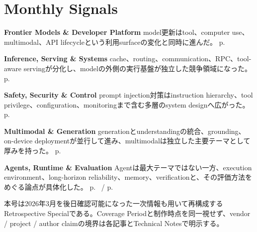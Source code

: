 \section*{Monthly Signals}
\smallskip
\noindent\textbf{Frontier Models \& Developer Platform} model更新はtool、computer use、multimodal、API lifecycleという利用surfaceの変化と同時に進んだ。 \hfill{\footnotesize p.~\pageref{pkg:frontier-models-platform-march}}\par
\smallskip
\noindent\textbf{Inference, Serving \& Systems} cache、routing、communication、RPC、tool-aware servingが分化し、modelの外側の実行基盤が独立した競争領域になった。 \hfill{\footnotesize p.~\pageref{pkg:inference-serving-systems-march}}\par
\smallskip
\noindent\textbf{Safety, Security \& Control} prompt injection対策はinstruction hierarchy、tool privilege、configuration、monitoringまで含む多層のsystem designへ広がった。 \hfill{\footnotesize p.~\pageref{pkg:safety-security-control-march}}\par
\smallskip
\noindent\textbf{Multimodal \& Generation} generationとunderstandingの統合、grounding、on-device deploymentが並行して進み、multimodalは独立した主要テーマとして厚みを持った。 \hfill{\footnotesize p.~\pageref{pkg:multimodal-generation-march}}\par
\smallskip
\noindent\textbf{Agents, Runtime \& Evaluation} Agentは最大テーマではない一方、execution environment、long-horizon reliability、memory、verificationと、その評価方法をめぐる論点が具体化した。 \hfill{\footnotesize p.~\pageref{pkg:agents-runtime-long-horizon-march} / p.~\pageref{pkg:paper-watch-march}}\par
\medskip
\begin{claimboundary}
本号は2026年3月を後日確認可能になった一次情報も用いて再構成するRetrospective Specialである。Coverage Periodと制作時点を同一視せず、vendor / project / author claimの境界は各記事とTechnical Notesで明示する。
\end{claimboundary}
\medskip
\setcounter{tocdepth}{1}
\tableofcontents
